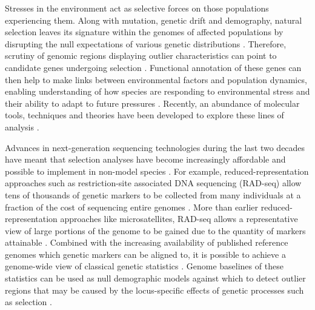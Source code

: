 \documentclass[12pt]{article}
\begin{document}
\begin{linenumbers}
	
	Stresses in the environment act as selective forces on those populations experiencing them. Along with mutation, genetic drift and demography, natural selection leaves its signature within the genomes of affected populations by disrupting the null expectations of various genetic distributions \citep{hohenlohe_using_2010, vitti_detecting_2013}. Therefore, scrutiny of genomic regions displaying outlier characteristics can point to candidate genes undergoing selection \citep{whitlock_reliable_2015, hoban_finding_2016, ahrens_search_2018}. Functional annotation of these genes can then help to make links between environmental factors and population dynamics, enabling understanding of how species are responding to environmental stress and their ability to adapt to future pressures \citep{hohenlohe_population_2010, pracana_fire_2017, buckley_restriction_2018, mollion_patterns_2017}. 
	Recently, an abundance of molecular tools, techniques and theories have been developed to explore these lines of analysis \citep{bourgeois_overview_2021}. 


	Advances in next-generation sequencing technologies during the last two decades have meant that selection analyses have become increasingly affordable and possible to implement in non-model species \citep{van_dijk_ten_2014, hu_next-generation_2021}. 
	For example, reduced-representation approaches such as restriction-site associated DNA sequencing (RAD-seq) allow tens of thousands of genetic markers to be collected from many individuals at a fraction of the cost of sequencing entire genomes \citep{miller_rapid_2007, baird_rapid_2008, andrews_harnessing_2016}. 
	More than earlier reduced-representation approaches like microsatellites, RAD-seq allows a representative view of large portions of the genome to be gained due to the quantity of markers attainable \citep{davey_radseq_2010, lozier_revisiting_2014, catchen_unbroken_2017, sunde_comparing_2020}. 
	Combined with the increasing availability of published reference genomes which genetic markers can be aligned to, it is possible to achieve a genome-wide view of classical genetic statistics \citep{manel_genomic_2016}. Genome baselines of these statistics can be used as null demographic models against which to detect outlier regions that may be caused by the locus-specific effects of genetic processes such as selection \citep{hohenlohe_using_2010, hohenlohe_population_2012, chavez-galarza_signatures_2013, sunde_comparing_2020}.
	

\end{linenumbers}
\end{document}
